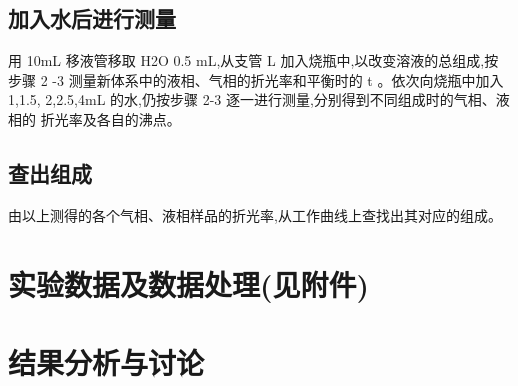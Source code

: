 \documentclass[11pt]{report}
\begin{document}
\section{加入水后进行测量}
\label{sec:orgeac73fc}
    用 10mL 移液管移取 H2O 0.5 mL,从支管 L 加入烧瓶中,以改变溶液的总组成,按步骤 2
-3 测量新体系中的液相、气相的折光率和平衡时的 t 。依次向烧瓶中加入 1,1.5,
2,2.5,4mL 的水,仍按步骤 2-3 逐一进行测量,分别得到不同组成时的气相、液相的
折光率及各自的沸点。
\section{查出组成}
\label{sec:orgfb12a83}
由以上测得的各个气相、液相样品的折光率,从工作曲线上查找出其对应的组成。



\chapter{实验数据及数据处理(见附件)}
\label{sec:org5dfb97b}
\chapter{结果分析与讨论}
\label{sec:org99030a7}
\end{document}
